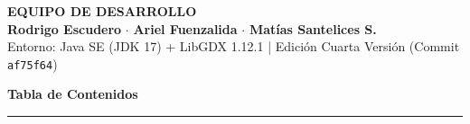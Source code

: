 \documentclass[11pt,a4paper]{article}
\begin{document}
\begin{titlepage}
\begin{center}
    \vfill

    \begin{tcolorbox}[
        enhanced,
        colback=NavyDark!85,
        colframe=CyanGlow!70,
        arc=3mm,
        width=0.88\textwidth,
        boxrule=1pt
    ]
        \centering
        {\sffamily\bfseries\color{white}\small EQUIPO DE DESARROLLO}\\[0.15cm]
        {\sffamily\color{CyanBright}\textbf{Rodrigo Escudero}} \textcolor{white!60}{$\cdot$}
        {\sffamily\color{CyanBright}\textbf{Ariel Fuenzalida}} \textcolor{white!60}{$\cdot$}
        {\sffamily\color{CyanBright}\textbf{Matías Santelices S.}}\\[0.15cm]
        {\sffamily\color{white!70}\scriptsize Entorno: Java SE (JDK 17) + LibGDX 1.12.1 \textcolor{CyanBright}{|} Edición Cuarta Versión (Commit \texttt{af75f64})}
    \end{tcolorbox}
    \vspace{0.2cm}
\end{center}
\end{titlepage}

\setcounter{page}{1}

\vspace*{0.5cm}
\begin{center}
    {\Huge\sffamily\bfseries\color{NavyDark} Tabla de Contenidos}\\[0.2cm]
    {\color{CyanGlow}\rule{6cm}{2pt}}
\end{center}

\vspace{0.6cm}
\end{document}
